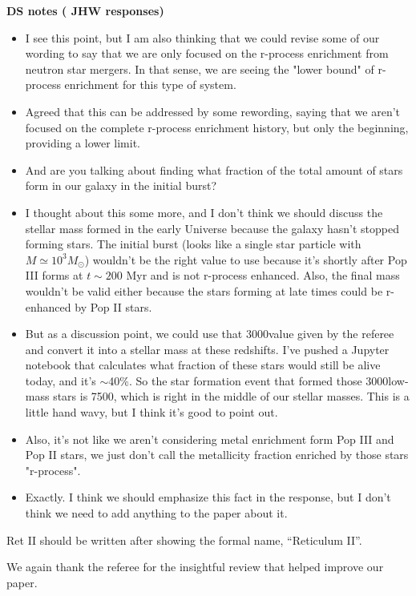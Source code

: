 \documentclass[11pt]{article}
\begin{document}
\noindent\textbf{DS notes {(\color{purple} JHW responses})}
\begin{itemize}
  \item I see this point, but I am also thinking that we could revise some of our wording to say that we are only focused on the r-process enrichment from neutron star mergers. In that sense, we are seeing the "lower bound" of r-process enrichment for this type of system.
  \item {\color{purple} Agreed that this can be addressed by some rewording, saying that we aren't focused on the complete r-process enrichment history, but only the beginning, providing a lower limit.}
  \item And are you talking about finding what fraction of the total amount of stars form in our galaxy in the initial burst? 
  \item {\color{purple} I thought about this some more, and I don't think we should discuss the stellar mass formed in the early Universe because the galaxy hasn't stopped forming stars.  The initial burst (looks like a single star particle with $M \simeq 10^3 M_\odot$) wouldn't be the right value to use because it's shortly after Pop III forms at $t \sim 200$ Myr and is not r-process enhanced.  Also, the final mass wouldn't be valid either because the stars forming at late times could be r-enhanced by Pop II stars.}
  \item {\color{purple} But as a discussion point, we could use that 3000\Ms value given by the referee and convert it into a stellar mass at these redshifts.  I've pushed a Jupyter notebook that calculates what fraction of these stars would still be alive today, and it's $\sim$40\%.  So the star formation event that formed those 3000\Ms low-mass stars is 7500\Ms, which is right in the middle of our stellar masses. This is a little hand wavy, but I think it's good to point out.}
  \item Also, it's not like we aren't considering metal enrichment form Pop III and Pop II stars, we just don't call the metallicity fraction enriched by those stars "r-process".
  \item {\color{purple} Exactly.  I think we should emphasize this fact in the response, but I don't think we need to add anything to the paper about it.}
\end{itemize}

\begin{tcolorbox}[colback={lightgray}] 
Ret II should be written after showing the formal name, “Reticulum II”.
\end{tcolorbox} 

We again thank the referee for the insightful review that helped improve our paper.



\end{document}
